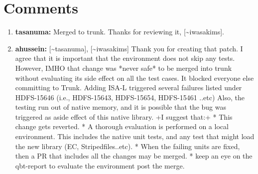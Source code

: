 \documentclass{report}%
\begin{document}
\section{Comments}%
\label{sec:Comments}%
\begin{enumerate}%
\item%
\textbf{tasanuma: }Merged to trunk. Thanks for reviewing it, {[}\textasciitilde{}iwasakims{]}.%
\item%
\textbf{ahussein: }{[}\textasciitilde{}tasanuma{]}, {[}\textasciitilde{}iwasakims{]} Thank you for creating that patch. I agree that it is important that the environment does not skip any tests.\newline%
\newline%
\newline%
\newline%
However, IMHO that change was *never safe* to be merged into trunk without evaluating its side effect on all the test cases.\newline%
\newline%
It blocked everyone else committing to Trunk.\newline%
\newline%
\newline%
\newline%
Adding ISA{-}L triggered several failures listed under HDFS{-}15646 (i.e., HDFS{-}15643, HDFS{-}15654, HDFS{-}15461 ..etc)\newline%
\newline%
Also, the testing run out of native memory, and it is possible that the bug was triggered as aside effect of this native library.\newline%
\newline%
\newline%
\newline%
+I suggest that:+\newline%
\newline%
* This change gets reverted.\newline%
\newline%
* A thorough evaluation is performed on a local environment. This includes the native unit tests, and any test that might load the new library (EC, Stripedfiles..etc).\newline%
\newline%
* When the failing units are fixed, then a PR that includes all the changes may be merged.\newline%
\newline%
* keep an eye on the qbt{-}report to evaluate the environment post the merge.\newline%

\end{enumerate}
\end{document}
